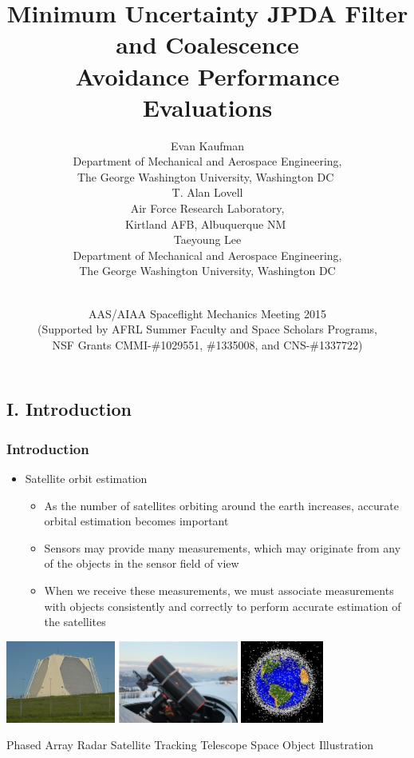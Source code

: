 \documentclass[hyperref={pdftex,pdfpagemode=none,pdfstartview=FitH},10pt]{beamer}
\title[Minimum Uncertainty JPDA and Coalescence-Avoiding Optimal JPDA Filtering]
{Minimum Uncertainty JPDA Filter and Coalescence
\\
Avoidance Performance Evaluations
}
\author{
Evan Kaufman\\
{\footnotesize\selectfont Department of Mechanical and Aerospace Engineering,\\
The George Washington University, Washington DC}
$ $\\
\vspace*{0.015\columnwidth}
T. Alan Lovell\\
{\footnotesize\selectfont Air Force Research Laboratory,\\ Kirtland AFB, Albuquerque NM}
$ $\\
\vspace*{0.015\columnwidth}
Taeyoung Lee\\
{\footnotesize\selectfont Department of Mechanical and Aerospace Engineering,\\
The George Washington University, Washington DC}
}
\date{\vspace*{-0.8cm}\\AAS/AIAA Spaceflight Mechanics Meeting 2015\vspace*{0.1cm}\\
\footnotesize\selectfont (Supported by AFRL Summer Faculty and Space Scholars Programs,\\ NSF Grants CMMI-\#1029551, \#1335008, and CNS-\#1337722)}
\begin{document}
\begin{frame}
  \titlepage
\end{frame}


\section*{}
\subsection*{I. Introduction}


\begin{frame}
\frametitle{Introduction}

\begin{itemize}
\item Satellite orbit estimation
	\begin{itemize}
	\item As the number of satellites orbiting around the earth increases, accurate orbital estimation becomes important
	\item Sensors may provide many measurements, which may originate from any of the objects in the sensor field of view
	\item When we receive these measurements, we must associate measurements with objects consistently and correctly to perform accurate estimation of the satellites
	\end{itemize}
\end{itemize}

\vfill
\centerline{
\includegraphics[height=2.7cm]{PhasedArrayRadar}\hspace*{0.2cm}
\includegraphics[height=2.7cm]{TelescopeTrackingSats}\hspace*{0.2cm}
\includegraphics[height=2.7cm]{SatDots}}
\centerline{\scriptsize\selectfont
\hspace*{0.6cm}Phased Array Radar\hspace*{1.7cm} Satellite Tracking Telescope\hspace*{1.0cm} Space Object Illustration}
\end{frame}
\end{document}

